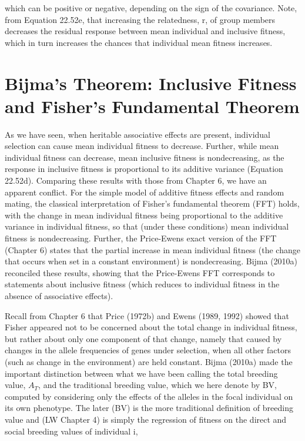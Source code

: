 \documentclass{article}
\begin{document}
which can be positive or negative, depending on the sign of the covariance. Note, from Equation 22.52e, that increasing the relatedness, r, of group members decreases the residual response between mean individual and inclusive fitness, which in turn increases the chances that individual mean fitness increases.

\section{Bijma's Theorem: Inclusive Fitness and Fisher's Fundamental Theorem}
As we have seen, when heritable associative effects are present, individual selection can cause mean individual fitness to decrease. Further, while mean individual fitness can decrease, mean inclusive fitness is nondecreasing, as the response in inclusive fitness is proportional to its additive variance (Equation 22.52d). Comparing these results with those from Chapter 6, we have an apparent conflict. For the simple model of additive fitness effects and random mating, the classical interpretation of Fisher's fundamental theorem (FFT) holds, with the change in mean individual fitness being proportional to the additive variance in individual fitness, so that (under these conditions) mean individual fitness is nondecreasing. Further, the Price-Ewens exact version of the FFT (Chapter 6) states that the partial increase in mean individual fitness (the change that occurs when set in a constant environment) is nondecreasing. Bijma (2010a) reconciled these results, showing that the Price-Ewens FFT corresponds to statements about inclusive fitness (which reduces to individual fitness in the absence of associative effects).

Recall from Chapter 6 that Price (1972b) and Ewens (1989, 1992) showed that Fisher appeared not to be concerned about the total change in individual fitness, but rather about only one component of that change, namely that caused by changes in the allele frequencies of genes under selection, when all other factors (such as change in the environment) are held constant. Bijma (2010a) made the important distinction between what we have been calling the total breeding value,  $ A_{T} $, and the traditional breeding value, which we here denote by BV, computed by considering only the effects of the alleles in the focal individual on its own phenotype. The later (BV) is the more traditional definition of breeding value and (LW Chapter 4) is simply the regression of fitness on the direct and social breeding values of individual i,
\end{document}
